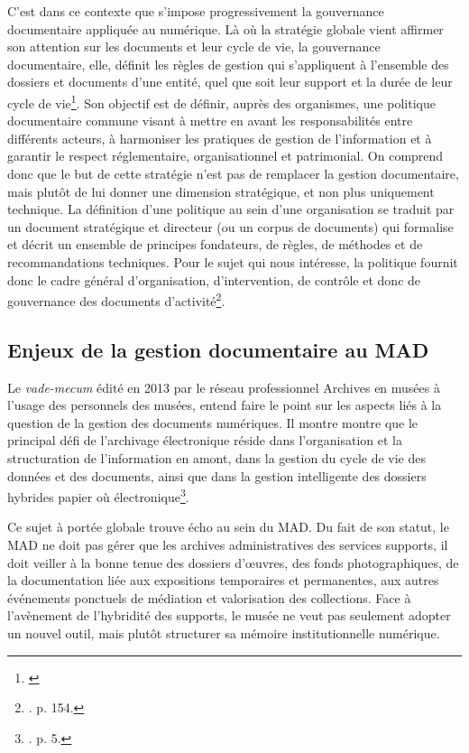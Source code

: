 C’est dans ce contexte que s’impose progressivement la gouvernance documentaire appliquée au numérique. Là où la stratégie globale vient affirmer son attention sur les documents et leur cycle de vie, la gouvernance documentaire, elle, définit les règles de gestion qui s’appliquent à l’ensemble des dossiers et documents d’une entité, quel que soit leur support et la durée de leur cycle de vie\footnote{\cite{archives-vaudoises-gouvernance-documentaire}}. Son objectif est de définir, auprès des organismes, une politique documentaire commune visant à mettre en avant les responsabilités entre différents acteurs, à harmoniser les pratiques de gestion de l’information et à garantir le respect réglementaire, organisationnel et patrimonial. On comprend donc que le but de cette stratégie n’est pas de remplacer la gestion documentaire, mais plutôt de lui donner une dimension stratégique, et non plus uniquement technique. La définition d’une politique au sein d’une organisation se traduit par un document stratégique et directeur (ou un corpus de documents) qui formalise et décrit un ensemble de principes fondateurs, de règles, de méthodes et de recommandations techniques. Pour le sujet qui nous intéresse, la politique fournit donc le cadre général d’organisation, d’intervention, de contrôle et donc de gouvernance des documents d’activité\footnote{\cite{arnaud-2012}. p. 154.}.


\subsection*{Enjeux de la gestion documentaire au MAD}

Le \textit{vade-mecum} édité en 2013 par le réseau professionnel Archives en musées à l’usage des personnels des musées, entend faire le point sur les aspects liés à la question de la gestion des documents numériques. Il montre montre que le principal défi de l’archivage électronique réside dans l’organisation et la structuration de l’information en amont, dans la gestion du cycle de vie des données et des documents, ainsi que dans la gestion intelligente des dossiers hybrides papier où électronique\footnote{\cite{archives-en-musees-electroniques}. p. 5.}.

Ce sujet à portée globale trouve écho au sein du MAD. Du fait de son statut, le MAD ne doit pas gérer que les archives administratives des services supports, il doit veiller à la bonne tenue des dossiers d’œuvres, des fonds photographiques, de la documentation liée aux expositions temporaires et permanentes, aux autres événements ponctuels de médiation et valorisation des collections. Face à l’avènement de l’hybridité des supports, le musée ne veut pas seulement adopter un nouvel outil, mais plutôt structurer sa mémoire institutionnelle numérique.\\[0.1cm]

